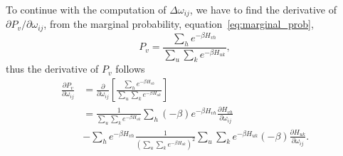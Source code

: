 To continue with the computation of $\Delta \omega_{ij}$, we have to find the derivative of $\partial P_{v}/\partial \omega_{ij}$, from the marginal probability, equation~\ref{eq:marginal_prob},
\begin{equation}
  P_{v} = \frac{\sum_{h} e^{-\beta H_{vh}}}{\sum_{u} \sum_{k} e^{-\beta H_{u k}}},
  \label{eq:marginal_prob_expansion}
\end{equation}
thus the derivative of $P_{v}$ follows
\begin{equation}
  \begin{split}
    \frac{\partial P_{v}}{\partial \omega_{ij}} & = \frac{\partial}{\partial \omega_{ij}} \left[ \frac{\sum_{h} e^{-\beta H_{vh}}}{\sum_{u} \sum_{k} e^{-\beta H_{u k}}} \right] \\
    & = \frac{1}{\sum_{u} \sum_{k} e^{-\beta H_{u k}}} \sum_{h} (-\beta) e^{-\beta H_{vh}} \frac{\partial H_{vh}}{\partial \omega_{ij}} \\
    & - \sum_{h} e^{-\beta H_{vh}} \frac{1}{{\left( \sum_{u} \sum_{k} e^{-\beta H_{u k}} \right)}^{2}} \sum_{u} \sum_{k} e^{-\beta H_{u k}} (-\beta) \frac{\partial H_{u k}}{\partial \omega_{ij}}.
  \end{split}
  \label{eq:eq14}
\end{equation}

